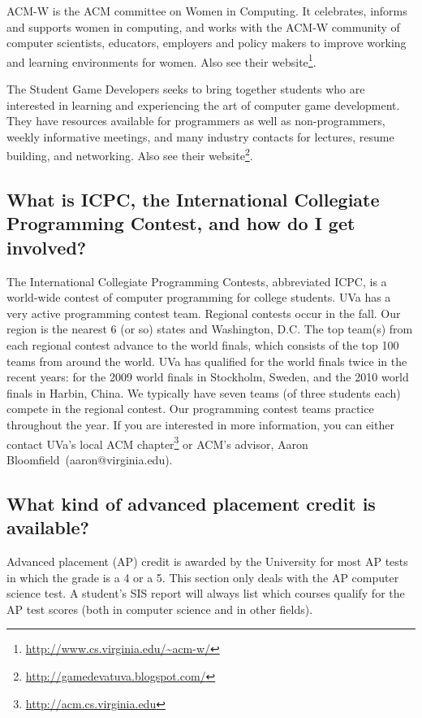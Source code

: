 \documentclass[10pt,letter]{book}
\makeatletter
\newcommand{\acmadvisor}{Aaron Bloomfield}
\newcommand{\acmadvisoremail}{aaron@virginia.edu}
\newcommand{\myurl}[1]{\footnote{\scriptsize\url{#1}}}
\makeatother
\begin{document}
ACM-W is the ACM committee on Women in Computing. It celebrates,
informs and supports women in computing, and works with the ACM-W
community of computer scientists, educators, employers and policy
makers to improve working and learning environments for women. Also
see their website\myurl{http://www.cs.virginia.edu/~acm-w/}.

The Student Game Developers seeks to bring together students who are
interested in learning and experiencing the art of computer game
development. They have resources available for programmers as well as
non-programmers, weekly informative meetings, and many industry
contacts for lectures, resume building, and networking. Also see their
website\myurl{http://gamedevatuva.blogspot.com/}. 

\subsection{What is ICPC, the International Collegiate Programming
  Contest, and how do I get involved?}

The International Collegiate Programming Contests, abbreviated ICPC,
is a world-wide contest of computer programming for college
students. UVa has a very active programming contest team. Regional
contests occur in the fall.  Our region is the nearest 6 (or so)
states and Washington, D.C. The top team(s) from each regional contest
advance to the world finals, which consists of the top 100 teams from
around the world. UVa has qualified for the world finals twice in the
recent years: for the 2009 world finals in Stockholm, Sweden, and the
2010 world finals in Harbin, China. We typically have seven teams (of
three students each) compete in the regional contest. Our programming
contest teams practice throughout the year. If you are interested in
more information, you can either contact UVa's local ACM
chapter\myurl{http://acm.cs.virginia.edu} or ACM's advisor,
\acmadvisor\ (\acmadvisoremail).

\subsection{What kind of advanced placement credit is available?}
\label{applacement}

Advanced placement (AP) credit is awarded by the University for most
AP tests in which the grade is a 4 or a 5. This section only deals
with the AP computer science test. A student's SIS report will
always list which courses qualify for the AP test scores (both in
computer science and in other fields).
\end{document}
